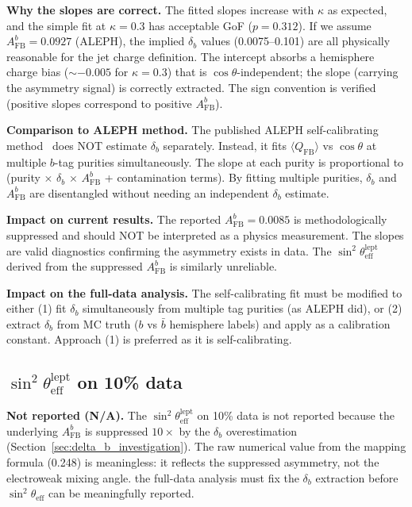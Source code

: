 \documentclass[11pt,a4paper]{article}
\begin{document}
\textbf{Why the slopes are correct.} The fitted slopes increase with $\kappa$ as
expected, and the simple fit at $\kappa = 0.3$ has acceptable GoF ($p = 0.312$).
If we assume $A_\mathrm{FB}^b = 0.0927$ (ALEPH), the implied $\delta_b$ values
(0.0075--0.101) are all physically reasonable for the jet charge definition.
The intercept absorbs a hemisphere charge bias ($\sim -0.005$ for $\kappa = 0.3$)
that is $\cos\theta$-independent; the slope (carrying the asymmetry signal) is
correctly extracted. The sign convention is verified (positive slopes correspond
to positive $A_\mathrm{FB}^b$).

\textbf{Comparison to ALEPH method.} The published ALEPH self-calibrating
method~\cite{ALEPH:AFBb} does NOT estimate $\delta_b$ separately. Instead, it fits
$\langle Q_\mathrm{FB} \rangle$ vs $\cos\theta$ at multiple $b$-tag purities
simultaneously. The slope at each purity is proportional to
(purity $\times$ $\delta_b$ $\times$ $A_\mathrm{FB}^b$ + contamination terms).
By fitting multiple purities, $\delta_b$ and $A_\mathrm{FB}^b$ are disentangled
without needing an independent $\delta_b$ estimate.

\textbf{Impact on current results.} The reported $A_\mathrm{FB}^b = 0.0085$ is
methodologically suppressed and should NOT be interpreted as a physics measurement.
The slopes are valid diagnostics confirming the asymmetry exists in data. The
$\sin^2\theta_\mathrm{eff}^\mathrm{lept}$ derived from the suppressed
$A_\mathrm{FB}^b$ is similarly unreliable.

\textbf{Impact on the full-data analysis.} The self-calibrating fit must be modified to either
(1) fit $\delta_b$ simultaneously from multiple tag purities (as ALEPH did), or
(2) extract $\delta_b$ from MC truth ($b$ vs $\bar{b}$ hemisphere labels) and apply
as a calibration constant. Approach (1) is preferred as it is self-calibrating.

\subsection{$\sin^2\theta_\mathrm{eff}^\mathrm{lept}$ on 10\% data}
\label{sec:result_sin2theta_10pct}

\textbf{Not reported (N/A).} The $\sin^2\theta_\mathrm{eff}^\mathrm{lept}$ on 10\%
data is not reported because the underlying $A_\mathrm{FB}^b$ is suppressed $10\times$
by the $\delta_b$ overestimation (Section~\ref{sec:delta_b_investigation}).
The raw numerical value from the mapping formula (0.248) is meaningless: it reflects
the suppressed asymmetry, not the electroweak mixing angle.
the full-data analysis must fix the $\delta_b$ extraction
before $\sin^2\theta_\mathrm{eff}$ can be meaningfully reported.
\end{document}
